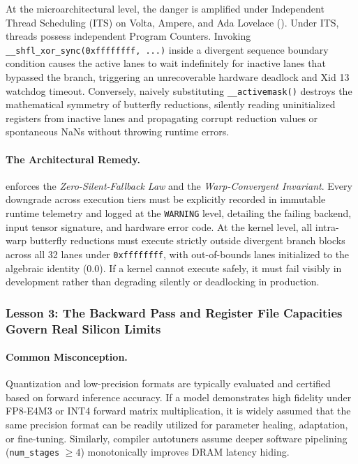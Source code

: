 At the microarchitectural level, the danger is amplified under Independent Thread Scheduling (ITS) on Volta, Ampere, and Ada Lovelace ().
Under ITS, threads possess independent Program Counters.
Invoking \texttt{\_\_shfl\_xor\_sync(0xffffffff, ...)} inside a divergent sequence boundary condition causes the active lanes to wait indefinitely for inactive lanes that bypassed the branch, triggering an unrecoverable hardware deadlock and Xid 13 watchdog timeout.
Conversely, naively substituting \texttt{\_\_activemask()} destroys the mathematical symmetry of butterfly reductions, silently reading uninitialized registers from inactive lanes and propagating corrupt reduction values or spontaneous NaNs without throwing runtime errors.

\paragraph{The Architectural Remedy.}
\neuralops{} enforces the \emph{Zero-Silent-Fallback Law} and the \emph{Warp-Convergent Invariant}.
Every downgrade across execution tiers must be explicitly recorded in immutable runtime telemetry and logged at the \texttt{WARNING} level, detailing the failing backend, input tensor signature, and hardware error code.
At the kernel level, all intra-warp butterfly reductions must execute strictly outside divergent branch blocks across all 32 lanes under \texttt{0xffffffff}, with out-of-bounds lanes initialized to the algebraic identity ($0.0$).
If a kernel cannot execute safely, it must fail visibly in development rather than degrading silently or deadlocking in production.

\subsubsection{Lesson 3: The Backward Pass and Register File Capacities Govern Real Silicon Limits}
\label{subsubsec:lesson3}

\paragraph{Common Misconception.}
Quantization and low-precision formats are typically evaluated and certified based on forward inference accuracy.
If a model demonstrates high fidelity under FP8-E4M3 or INT4 forward matrix multiplication, it is widely assumed that the same precision format can be readily utilized for parameter healing, adaptation, or fine-tuning.
Similarly, compiler autotuners assume deeper software pipelining (\texttt{num\_stages} $\ge 4$) monotonically improves DRAM latency hiding.

